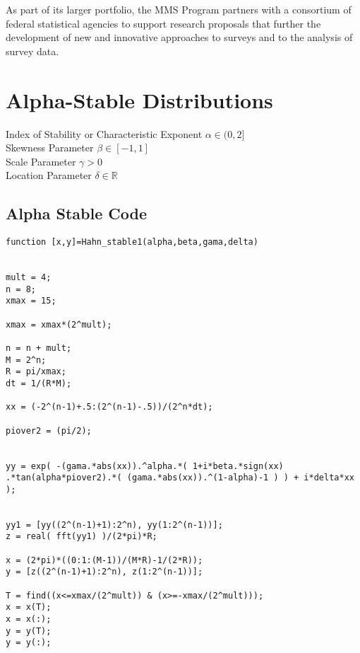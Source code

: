 \documentclass[8pt,journal,compsoc]{IEEEtran}
\begin{document}
As part of its larger portfolio, the MMS Program partners with a consortium of federal statistical agencies to support research proposals that further the development of new and innovative approaches to surveys and to the analysis of survey data.















\cite{kennedy2010particle}
\cite{yang2009cuckoo}
\cite{yang2010firefly}
\cite{gandomi2013cuckoo}
\cite{yang2010eagle}
\cite{yang2013computational}
\cite{pomerleau1989alvinn}
\cite{mitchell1997machine}
\cite{eberhart1995new}
\cite{nolan2003stable}
\cite{aarts1988simulated}
\cite{fisher1936use}
\cite{gorman1988analysis}
\cite{nourani1998comparison}
\cite{hajek1988cooling}
\cite{henderson2003theory}
\cite{rakitianskaia2012training}
\cite{vilovic2009using}




\clearpage

\section{Alpha-Stable Distributions}

Index of Stability or Characteristic Exponent $\alpha\in(0,2]$\\
Skewness Parameter $\beta\in[-1,1]$\\
Scale Parameter $\gamma>0$\\
Location Parameter $\delta \in \mathbb{R}$\\

\subsection{Alpha Stable Code}
\small
\begin{verbatim}
function [x,y]=Hahn_stable1(alpha,beta,gama,delta)


mult = 4;
n = 8; 
xmax = 15;

xmax = xmax*(2^mult);

n = n + mult;
M = 2^n;
R = pi/xmax;
dt = 1/(R*M);

xx = (-2^(n-1)+.5:(2^(n-1)-.5))/(2^n*dt);

piover2 = (pi/2);


yy = exp( -(gama.*abs(xx)).^alpha.*( 1+i*beta.*sign(xx)
.*tan(alpha*piover2).*( (gama.*abs(xx)).^(1-alpha)-1 ) ) + i*delta*xx );
  

yy1 = [yy((2^(n-1)+1):2^n), yy(1:2^(n-1))];
z = real( fft(yy1) )/(2*pi)*R;

x = (2*pi)*((0:1:(M-1))/(M*R)-1/(2*R));
y = [z((2^(n-1)+1):2^n), z(1:2^(n-1))];   

T = find((x<=xmax/(2^mult)) & (x>=-xmax/(2^mult)));
x = x(T); 
x = x(:);
y = y(T); 
y = y(:);
\end{verbatim}
\normalsize
\end{document}
